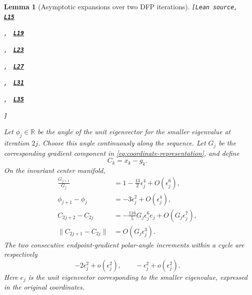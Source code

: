 \documentclass[11pt]{article}
\newtheorem{lemma}[theorem]{Lemma}
\newcommand{\R}{\mathbb R}
\newcommand{\leanLinkText}[1]{%
  \underline{\textbf{#1}}%
}
\newcommand{\leanSnapshot}{e308927f5b7930bdd002f0c0e42b9d112ad821cb}
\newcommand{\leanDeclTag}[2]{%
  {\footnotesize\texttt{[Lean source, }}%
  \href{https://github.com/imathwy/DFP_wolfe_local/blob/\leanSnapshot/#1?plain=1\#L#2}%
    {\leanLinkText{\footnotesize\texttt{L#2}}}%
}
\newcommand{\leanDeclTagExtra}[2]{%
  \unskip
  {\footnotesize\texttt{, }}%
  \href{https://github.com/imathwy/DFP_wolfe_local/blob/\leanSnapshot/#1?plain=1\#L#2}%
    {\leanLinkText{\footnotesize\texttt{L#2}}}\allowbreak
}
\newcommand{\leanDeclTagEnd}{%
  \unskip
  {\footnotesize\texttt{]}}\enspace
}
\begin{document}
\begin{lemma}[Asymptotic expansions over two DFP iterations]\label{lem:two-step-expansions}
\leanDeclTag{DFPWolfe/A_uniformly_convex_counterexample_to_global_convergence_of_DFP_under_weak_Wolfe_/Lemma_Physical_drift_on_the_slow_curve.lean}{15}
\leanDeclTagExtra{DFPWolfe/A_uniformly_convex_counterexample_to_global_convergence_of_DFP_under_weak_Wolfe_/Lemma_Physical_drift_on_the_slow_curve.lean}{19}
\leanDeclTagExtra{DFPWolfe/A_uniformly_convex_counterexample_to_global_convergence_of_DFP_under_weak_Wolfe_/Lemma_Physical_drift_on_the_slow_curve.lean}{23}
\leanDeclTagExtra{DFPWolfe/A_uniformly_convex_counterexample_to_global_convergence_of_DFP_under_weak_Wolfe_/Lemma_Physical_drift_on_the_slow_curve.lean}{27}
\leanDeclTagExtra{DFPWolfe/A_uniformly_convex_counterexample_to_global_convergence_of_DFP_under_weak_Wolfe_/Lemma_Physical_drift_on_the_slow_curve.lean}{31}
\leanDeclTagExtra{DFPWolfe/A_uniformly_convex_counterexample_to_global_convergence_of_DFP_under_weak_Wolfe_/Lemma_Physical_drift_on_the_slow_curve.lean}{35}
\leanDeclTagEnd
Let $\phi_j\in\R$ be the angle of the unit eigenvector for the smaller
eigenvalue at iteration $2j$.  Choose this angle continuously along the
sequence.  Let $G_j$ be the corresponding gradient component in
\eqref{eq:coordinate-representation}, and define
\[
C_k=x_k-g_k.
\]
On the invariant center manifold,
\begin{align}
\frac{G_{j+1}}{G_j}
&=1-\frac{13}{2}\epsilon_j^4+O(\epsilon_j^6),
\label{eq:G-map}\\
\phi_{j+1}-\phi_j
&=-3\epsilon_j^2+O(\epsilon_j^4),
\label{eq:phi-map}\\
C_{2j+2}-C_{2j}
&=-\frac{116}{5}G_j\epsilon_j^6e_j
+O(G_j\epsilon_j^7),
\label{eq:C-map}\\
\|C_{2j+1}-C_{2j}\|&=O(G_j\epsilon_j^3).
\label{eq:C-half}
\end{align}
The two consecutive endpoint-gradient polar-angle increments within a cycle are
respectively
\begin{equation}\label{eq:half-angles}
-2\epsilon_j^2+o(\epsilon_j^2),
\qquad -\epsilon_j^2+o(\epsilon_j^2).
\end{equation}
Here $e_j$ is the unit eigenvector corresponding to the smaller eigenvalue,
expressed in the original coordinates.
\end{lemma}
\end{document}
